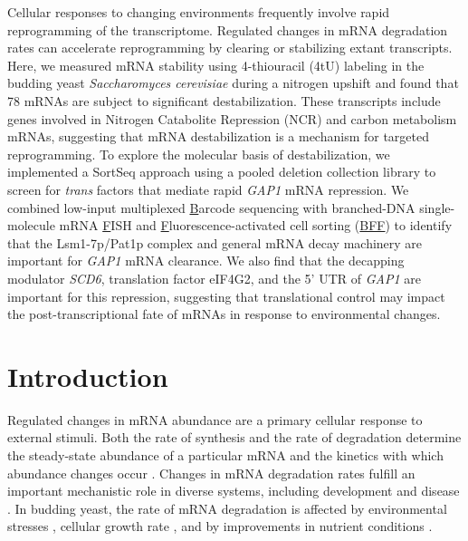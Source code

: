 Cellular responses to changing environments frequently
involve rapid reprogramming of the transcriptome.
Regulated changes in mRNA degradation rates can
accelerate reprogramming by clearing or stabilizing extant transcripts. 
Here, we measured mRNA stability using 4-thiouracil (4tU) labeling
in the budding yeast \textit{Saccharomyces cerevisiae}
during a nitrogen upshift and found that 78 mRNAs are subject
to significant destabilization. These transcripts include 
genes involved in Nitrogen
Catabolite Repression (NCR) and carbon metabolism mRNAs,
suggesting that mRNA destabilization is a mechanism 
for targeted reprogramming.
To explore the molecular basis of
destabilization, we implemented a SortSeq approach 
using a pooled deletion collection library
to screen for \textit{trans} factors that mediate rapid \textit{GAP1}
mRNA repression.
We combined low-input multiplexed \underline{B}arcode sequencing 
with branched-DNA single-molecule mRNA \underline{F}ISH and 
\underline{F}luorescence-activated cell sorting (\underline{BFF})
to identify that the Lsm1-7p/Pat1p complex and general mRNA
decay machinery are important for \textit{GAP1} mRNA clearance.
We also find that the decapping modulator \textit{SCD6}, translation
factor eIF4G2, and the 5' UTR of \textit{GAP1}
are important for this repression, 
suggesting that translational control may impact the 
post-transcriptional fate of mRNAs in response to 
environmental changes.

\section{Introduction}

Regulated changes in mRNA abundance are a primary cellular response
to external stimuli.
Both the rate of synthesis and the rate of degradation determine the
steady-state abundance of a particular mRNA and the kinetics
with which abundance changes occur
\parencite{hargrove1989role,perez2013eukaryotic}. 
Changes in mRNA degradation rates fulfill an important 
mechanistic role in diverse systems, including 
development \parencite{alonso2012complex,west2018developmental} and disease
\parencite{aghib19903}.
In budding yeast, the rate of
mRNA degradation is affected by environmental stresses
\parencite{canadell2015impact}, cellular growth rate
\parencite{garcia2016growth}, and by improvements in 
nutrient conditions \parencite{scheffler1998control}.

